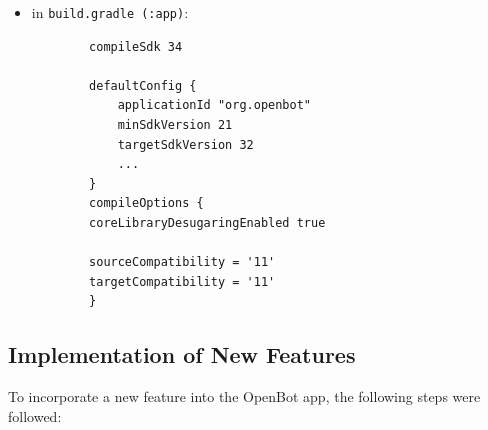 \documentclass[12pt]{report}
\begin{document}
\begin{enumerate}
\begin{itemize}
        \item in \texttt{build.gradle (:app)}:
        \begin{lstlisting}
        compileSdk 34

        defaultConfig {
            applicationId "org.openbot"
            minSdkVersion 21
            targetSdkVersion 32
            ...
        }
        compileOptions {
        coreLibraryDesugaringEnabled true

        sourceCompatibility = '11'
        targetCompatibility = '11'
        }
        \end{lstlisting}
        \end{itemize}
    
    
\end{enumerate}


\subsection{Implementation of New Features}
\label{sub:Implementation_of_New_Features}

To incorporate a new feature into the OpenBot app, the following steps were followed:
\end{document}
